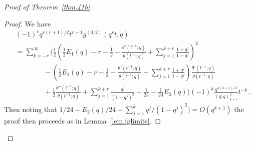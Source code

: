 \documentclass[12pt,reqno]{amsart}
\theoremstyle{definition}
\def\be{\begin{equation}}
\def\ee{\end{equation}}
\begin{document}
\begin{proof}[Proof of Theorem~\ref{thm.41b}]
\begin{proof}
We have
\be
\begin{aligned}
&(-1)^{r}q^{r(r+1)/2}t^{r+1}g^{(0,2)}(q^{r}t,q)\\
&=
\sum_{k=-r}^{\infty}
\Bigg(\frac{1}{2}\left(\frac{1}{2}E_{1}(q)-r-\frac{1}{2}-\frac{\theta'(t^{-1};q)}{\theta(t^{-1};q)}+\sum_{j=1}^{k+r}\frac{1+q^{j}}{1-q^{j}}\right)^{2}\\
&\qquad\qquad-\left(\frac{1}{2}E_{1}(q)-r-\frac{1}{2}-\frac{\theta'(t^{-1};q)}{\theta(t^{-1};q)}+\sum_{j=1}^{k+r}\frac{1+q^{j}}{1-q^{j}}\right)
  \frac{\theta'(t^{-1};q)}{\theta(t^{-1};q)}\\
  &\qquad\qquad+\frac{1}{2}
  \frac{\theta''(t^{-1};q)}{\theta(t^{-1};q)}+\sum_{j=1}^{k+r}\frac{q^{j}}{(1-q^{j})^2}-\frac{1}{24}-\frac{1}{24}E_{2}(q)\Bigg)(-1)^{k}
\frac{q^{k(k+1)/2}}{(q;q)_{k+r}^{2}}t^{-k} \,.
\end{aligned}
\ee
Then noting that $1/24-E_2(q)/24-\sum_{j=1}^{k}q^j/(1-q^j)^2)=O(q^{k+1})$ the proof then proceeds as in Lemma~\ref{lem.fglimits}.
\end{proof}


\end{proof}
\end{document}

